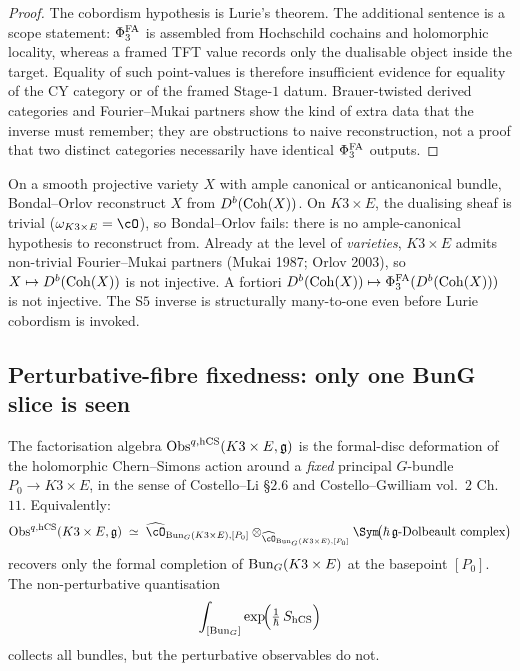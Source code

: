 \begin{proof}
The cobordism hypothesis is Lurie's theorem. The additional sentence is
a scope statement: $\Phi^{\mathrm{FA}}_3$ is assembled from Hochschild cochains and
holomorphic locality, whereas a framed TFT value records only the
dualisable object inside the target. Equality of such point-values is
therefore insufficient evidence for equality of the CY category or of
the framed Stage-$1$ datum. Brauer-twisted derived categories and
Fourier--Mukai partners show the kind of extra data that the inverse
must remember; they are obstructions to naive reconstruction, not a
proof that two distinct categories necessarily have identical
$\Phi^{\mathrm{FA}}_3$ outputs.
\end{proof}

\begin{remark}
\label{rem:agent08-bondal-orlov-fail}
On a smooth projective variety $X$ with ample canonical or anticanonical
bundle, Bondal--Orlov \cite{BondalOrlov2001} reconstruct $X$ from
$D^b(\mathrm{Coh}(X))$. On $K3\times E$, the dualising sheaf is trivial
($\omega_{K3\times E}=\cO$), so Bondal--Orlov fails: there is no
ample-canonical hypothesis to reconstruct from. Already at the level of
\emph{varieties}, $K3\times E$ admits non-trivial Fourier--Mukai partners
(Mukai 1987; Orlov 2003), so $X\mapsto D^b(\mathrm{Coh}(X))$ is not injective.
A fortiori $D^b(\mathrm{Coh}(X))\mapsto\Phi^{\mathrm{FA}}_3(D^b(\mathrm{Coh}(X)))$ is not injective.
The S$5$ inverse is structurally many-to-one even before Lurie cobordism
is invoked.
\end{remark}

\subsection{Perturbative-fibre fixedness: only one BunG slice is seen}
\label{wn:subsec:agent08-perturbative}

\begin{proposition}
\label{prop:agent08-perturbative-fibre}
\ClaimStatusTheorem{} The factorisation algebra
$\mathrm{Obs}^{q,\mathrm{hCS}}(K3\times E,\mathfrak{g})$ is the formal-disc deformation of the
holomorphic Chern--Simons action around a \emph{fixed} principal
$G$-bundle $P_0\to K3\times E$, in the sense of Costello--Li
\cite{CostelloLi2020} \S$2.6$ and Costello--Gwilliam \cite{CostelloGwilliam2017}
vol.~$2$ Ch.~$11$. Equivalently:
\[
 \Obs^{q,\hCS}(K3\times E,\frakg)
 \;\simeq\;
 \widehat{\cO}_{\Bun_G(K3\times E),[P_0]}
 \otimes_{\widehat{\cO}_{\Bun_G(K3\times E),[P_0]}}
 \Sym\!\bigl(\hbar\,\frakg\textup{-Dolbeault complex}\bigr)
\]
recovers only the formal completion of $\mathrm{Bun}_G(K3\times E)$ at the
basepoint $[P_0]$. The non-perturbative quantisation
\[
 \int_{[\mathrm{Bun}_G]} \exp\!\Bigl(\tfrac{1}{\hbar}\,S_{\mathrm{hCS}}\Bigr)
\]
collects all bundles, but the perturbative observables do not.
\end{proposition}

